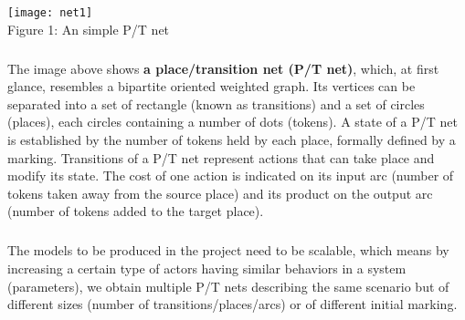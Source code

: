 \documentclass{article}
\begin{document}
	\begin{center}
		\texttt{[image: net1]}
		\\Figure 1: An simple P/T net
	\end{center}
	\subparagraph{}
	The image above shows \textbf{a place/transition net (P/T net)}, which, at first glance, resembles a bipartite oriented weighted graph. Its vertices can be separated into a set of rectangle (known as transitions) and a set of circles (places), each circles containing a number of dots (tokens). A state of a P/T net is established by the number of tokens held by each place, formally defined by a marking. Transitions of a P/T net represent actions that can take place and modify its state. The cost of one action is indicated on its input arc (number of tokens taken away from the source place) and its product on the output arc (number of tokens added to the target place).
	\subparagraph{}The models to be produced in the project need to be scalable, which means by increasing a certain type of actors having similar behaviors in a system (parameters), we obtain multiple P/T nets describing the same scenario but of different sizes (number of transitions/places/arcs) or of different initial marking.
\end{document}
